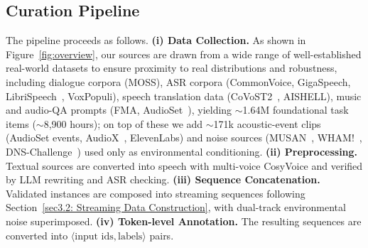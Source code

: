 \documentclass{article}
\begin{document}

\vspace{-2.4mm}
\subsection{Curation Pipeline}
\label{sec:curation_pipeline}
\vspace{-2mm}

The pipeline proceeds as follows. \textbf{(i) Data Collection.} As shown in
Figure~\ref{fig:overview}, our sources are drawn from a wide range of well-established
real-world datasets to ensure proximity to real distributions and robustness, including
dialogue corpora (MOSS), ASR corpora (CommonVoice, GigaSpeech,
LibriSpeech~\citep{panayotov2015librispeech}, VoxPopuli), speech translation data
(CoVoST2~\citep{wang2021covost}, AISHELL), music and audio-QA prompts (FMA,
AudioSet~\citep{gemmeke2017audio}), yielding $\sim$1.64M foundational task items
($\sim$8{,}900 hours); on top of these we add $\sim$171k acoustic-event clips
(AudioSet events, AudioX~\citep{tian2025audiox}, ElevenLabs) and noise sources
(MUSAN~\citep{snyder2015musan}, WHAM!~\citep{wichern2019wham},
DNS-Challenge~\citep{timcheck2023intel}) used only as environmental conditioning.
\textbf{(ii) Preprocessing.} Textual sources are converted into speech with multi-voice
CosyVoice and verified by LLM rewriting and ASR checking. \textbf{(iii) Sequence
Concatenation.} Validated instances are composed into streaming sequences following
Section~\ref{sec3.2: Streaming Data Construction}, with dual-track environmental noise
superimposed. \textbf{(iv) Token-level Annotation.} The resulting sequences are converted
into $\langle\text{input ids}, \text{labels}\rangle$ pairs.
\end{document}
